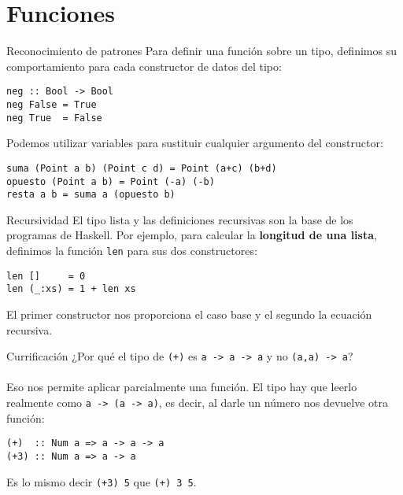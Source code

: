 \section{Funciones}

\begin{frame}[fragile]{Reconocimiento de patrones}
  Para definir una función sobre un tipo, definimos su comportamiento para cada
  constructor de datos del tipo:

  \espacio

  \begin{lstlisting}
neg :: Bool -> Bool
neg False = True
neg True  = False
  \end{lstlisting}

  \espacio

  Podemos utilizar variables para sustituir cualquier argumento del constructor:

  \espacio

  \begin{lstlisting}
suma (Point a b) (Point c d) = Point (a+c) (b+d)
opuesto (Point a b) = Point (-a) (-b)
resta a b = suma a (opuesto b)
  \end{lstlisting}
\end{frame}

\begin{frame}[fragile]{Recursividad}
  El tipo lista y las definiciones recursivas son la base de los programas de Haskell.
  Por ejemplo, para calcular la \textbf{longitud de una lista}, definimos la función
  \texttt{len} para sus dos constructores:

  \espacio

  \begin{lstlisting}
len []     = 0
len (_:xs) = 1 + len xs
  \end{lstlisting}

    \espacio

  El primer constructor nos proporciona el caso base y el segundo la ecuación recursiva.
\end{frame}

\begin{frame}[fragile]{Currificación}
  ¿Por qué el tipo de \texttt{(+)} es \texttt{a -> a -> a} y no
   \texttt{(a,a) -> a}?
  \\~\\
  Eso nos permite aplicar parcialmente una función. El tipo hay que leerlo realmente como
  \texttt{a -> (a -> a)}, es decir, al darle un número nos devuelve otra función:
    \begin{lstlisting}
(+)  :: Num a => a -> a -> a
(+3) :: Num a => a -> a
  \end{lstlisting}
  Es lo mismo decir \texttt{(+3) 5} que \texttt{(+) 3 5}.
\end{frame}


